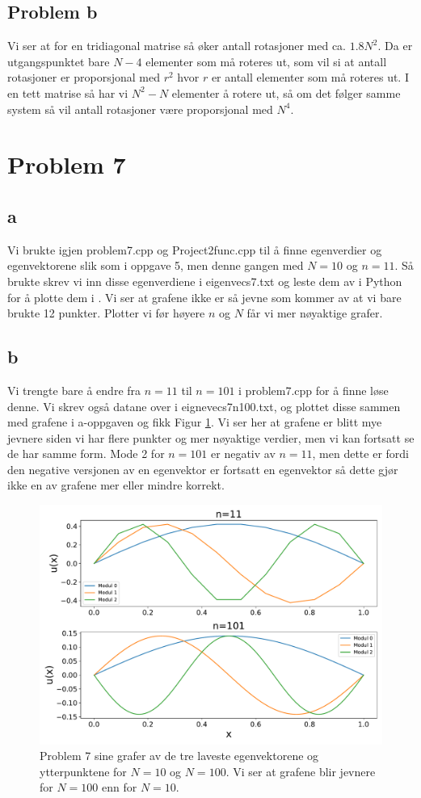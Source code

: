 \documentclass[reprint,english,notitlepage]{revtex4-1}  %
\begin{document}
\subsection*{Problem b}

Vi ser at for en tridiagonal matrise så øker antall rotasjoner med ca. $1.8 N^2$. Da er utgangspunktet bare $N-4$ elementer som må roteres ut, som vil si at antall rotasjoner er proporsjonal med $r^2$ hvor $r$ er antall elementer som må roteres ut. I en tett matrise så har vi $N^2 - N$ elementer å rotere ut, så om det følger samme system så vil antall rotasjoner være proporsjonal med $N^4$.
\section*{Problem 7}
\subsection*{a}
Vi brukte igjen problem7.cpp og Project2func.cpp til å finne egenverdier og egenvektorene slik som i oppgave 5, men denne gangen med $N=10$ og $n=11$. Så brukte skrev vi inn disse egenverdiene i eigenvecs7.txt og leste dem av i Python for å plotte dem i . Vi ser at grafene ikke er så jevne som kommer av at vi bare brukte 12 punkter. Plotter vi før høyere $n$ og $N$ får vi mer nøyaktige grafer.
\subsection*{b}
Vi trengte bare å endre fra $n=11$ til $n=101$ i problem7.cpp for å finne løse denne. Vi skrev også datane over i eignevecs7n100.txt, og plottet disse sammen med grafene i a-oppgaven og fikk Figur \ref{p7graf}. Vi ser her at grafene er blitt mye jevnere siden vi har flere punkter og mer nøyaktige verdier, men vi kan fortsatt se de har samme form. Mode 2 for $n=101$ er negativ av $n=11$, men dette er fordi den negative versjonen av en egenvektor er fortsatt en egenvektor så dette gjør ikke en av grafene mer eller mindre korrekt.
\begin{figure}[H]
	\label{p7graf}
	\includegraphics[scale=0.4]{Images/p7.pdf}
	\caption{Problem 7 sine grafer av de tre laveste egenvektorene og ytterpunktene for $N=10$ og $N=100$. Vi ser at grafene blir jevnere for $N=100$ enn for $N=10$.}
\end{figure}

\end{document}
